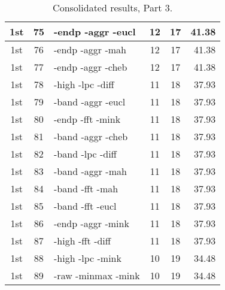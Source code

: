\begin{table}
\begin{minipage}[b]{\textwidth}
\begin{tabular}{|c|c|l|c|c|r|}
1st & 75 & -endp -aggr -eucl  & 12 & 17 & 41.38\\ \hline
1st & 76 & -endp -aggr -mah  & 12 & 17 & 41.38\\ \hline
1st & 77 & -endp -aggr -cheb  & 12 & 17 & 41.38\\ \hline
1st & 78 & -high -lpc -diff  & 11 & 18 & 37.93\\ \hline
1st & 79 & -band -aggr -eucl  & 11 & 18 & 37.93\\ \hline
1st & 80 & -endp -fft -mink  & 11 & 18 & 37.93\\ \hline
1st & 81 & -band -aggr -cheb  & 11 & 18 & 37.93\\ \hline
1st & 82 & -band -lpc -diff  & 11 & 18 & 37.93\\ \hline
1st & 83 & -band -aggr -mah  & 11 & 18 & 37.93\\ \hline
1st & 84 & -band -fft -mah  & 11 & 18 & 37.93\\ \hline
1st & 85 & -band -fft -eucl  & 11 & 18 & 37.93\\ \hline
1st & 86 & -endp -aggr -mink  & 11 & 18 & 37.93\\ \hline
1st & 87 & -high -fft -diff  & 11 & 18 & 37.93\\ \hline
1st & 88 & -high -lpc -mink  & 10 & 19 & 34.48\\ \hline
1st & 89 & -raw -minmax -mink  & 10 & 19 & 34.48\\ \hline
\end{tabular}
\end{minipage}
\caption{Consolidated results, Part 3.}
\label{tab:results3}
\end{table}

